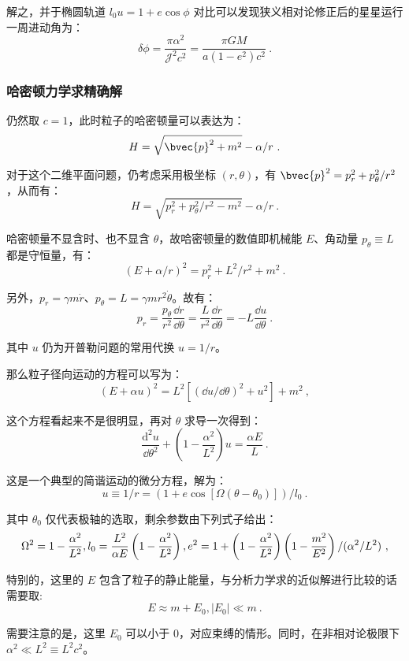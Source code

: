 解之，并于椭圆轨道 $l_0 u = 1 + e \cos \phi$ 对比可以发现狭义相对论修正后的星星运行一周进动角为：
\begin{equation}
\delta \phi = \frac{\pi \alpha^2}{\mathcal J^2c^2} = \frac{\pi G M}{a (1-e^2) c^2} ~.
\end{equation}


\subsubsection{哈密顿力学求精确解}
仍然取 $c=1$，此时粒子的哈密顿量可以表达为：
$$H = \sqrt{\bvec{p}^2 + m^2} - \alpha/r ~.$$

对于这个二维平面问题，仍考虑采用极坐标 $(r, \theta)$，有 $\bvec{p}^2 = p_r^2 + p_\theta^2/r^2$，从而有：
$$H = \sqrt{p_r^2+p_\theta^2/r^2 -m^2}-\alpha/r ~.$$

哈密顿量不显含时、也不显含 $\theta$，故哈密顿量的数值即机械能 $E$、角动量 $p_\theta \equiv  L$ 都是守恒量，有：
$$\left(E + \alpha/r\right) ^2 = p_r^2 + L^2/r^2 + m^2 ~.$$

另外，$p_r = \gamma m \dot r$、$p_\theta = L = \gamma m r^2 \dot \theta$。故有：
$$p_r = \frac{p_\theta}{r^2}\frac{\dd r}{\dd \theta} = \frac{L}{r^2} \frac{\dd r}{\dd \theta} = -L \frac{\dd u}{\dd \theta} ~.$$

其中 $u$ 仍为开普勒问题的常用代换 $u = 1/r$。

那么粒子径向运动的方程可以写为：
$$ (E+\alpha u)^2 = L^2 [(\dd u/\dd \theta)^2 + u^2] + m^2 ~,$$

这个方程看起来不是很明显，再对 $\theta$ 求导一次得到：
$$\frac{\mathrm{d}^2 u}{{\dd \theta ^2}} + \left(1-\frac{\alpha^2}{L^2}\right) u = \frac{\alpha E}{L} ~.$$

这是一个典型的简谐运动的微分方程，解为：
$$u \equiv 1/r = (1 + e \cos[\Omega (\theta - \theta_0)])/l_0 ~.$$

其中 $\theta_0$ 仅代表极轴的选取，剩余参数由下列式子给出：
$$\Omega^2 = 1-\frac{\alpha^2}{L^2}, l_0 = \frac{L^2}{\alpha E} \left( 1-\frac{\alpha^2}{L^2} \right), \\
e^2 = 1 + {\left(1-\frac{\alpha^2}{L^2}\right) \left(1-\frac{m^2}{E^2}\right)/(\alpha^2 / L^2) } ~,$$

特别的，这里的 $E$ 包含了粒子的静止能量，与分析力学求的近似解进行比较的话需要取:
$$E \approx m + E_0, |E_0| \ll m ~.$$

需要注意的是，这里 $E_0$ 可以小于 $0$，对应束缚的情形。同时，在非相对论极限下 $\alpha^2 \ll L^2 \equiv L^2c^2$。